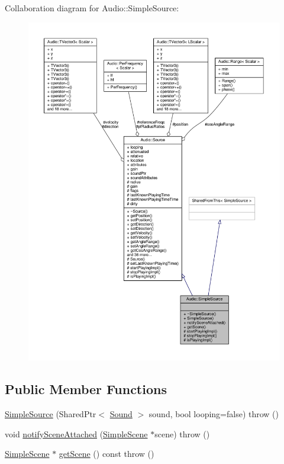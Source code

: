 Collaboration diagram for Audio\+:\+:Simple\+Source\+:
\nopagebreak
\begin{figure}[H]
\begin{center}
\leavevmode
\includegraphics[width=350pt]{dc/d89/classAudio_1_1SimpleSource__coll__graph}
\end{center}
\end{figure}
\subsection*{Public Member Functions}
\begin{DoxyCompactItemize}
\item 
\hyperlink{classAudio_1_1SimpleSource_af84b29bdf8c509de3c627412eaf8b460}{Simple\+Source} (Shared\+Ptr$<$ \hyperlink{classAudio_1_1Sound}{Sound} $>$ sound, bool looping=false)  throw ()
\item 
void \hyperlink{classAudio_1_1SimpleSource_ac92cd8634385604a60eaf5a037b32fb5}{notify\+Scene\+Attached} (\hyperlink{classAudio_1_1SimpleScene}{Simple\+Scene} $\ast$scene)  throw ()
\item 
\hyperlink{classAudio_1_1SimpleScene}{Simple\+Scene} $\ast$ \hyperlink{classAudio_1_1SimpleSource_aaae13dd5bac1972a0d80637595e52dc9}{get\+Scene} () const   throw ()
\end{DoxyCompactItemize}
